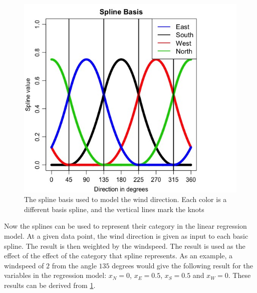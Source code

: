 \begin{figure}
    \centering
    \includegraphics[width=.8\textwidth]{../../../figures/SplineBasis.jpeg}
    \caption{The spline basis used to model the wind direction. Each color is a different basis spline, and the vertical lines mark the knots}
    \label{fig:spline_basis}
\end{figure}

\noindent Now the splines can be used to represent their category in the linear regression model. At a given data point, the wind direction is given as input to each basic spline. The result is then weighted by the windspeed. The result is used as the effect of the effect of the category that spline represents. As an example, a windspeed of $2$ from the angle $135$ degrees would give the following result for the variables in the regression model: $x_N=0$, $x_E=0.5$, $x_S=0.5$ and $x_W=0$. These results can be derived from \cref{fig:spline_basis}.







